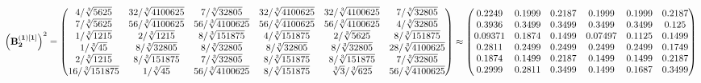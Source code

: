 \documentclass[10pt,a4paper]{article}
\begin{document}
	\[
		\left(\bold{B_2^{(1)[1]}}\right)^{2} = 
		\begin{pmatrix}
			{{4}} / {\sqrt[3]{5625}} & {{32}} / {\sqrt[3]{4100625}} & {{7}} / {\sqrt[3]{32805}} & {{32}} / {\sqrt[3]{4100625}} & {{32}} / {\sqrt[3]{4100625}} & {{7}} / {\sqrt[3]{32805}} \\
			{{7}} / {\sqrt[3]{5625}} & {{56}} / {\sqrt[3]{4100625}} & {{56}} / {\sqrt[3]{4100625}} & {{56}} / {\sqrt[3]{4100625}} & {{56}} / {\sqrt[3]{4100625}} & {{4}} / {\sqrt[3]{32805}} \\
			{1} / {\sqrt[3]{1215}} & {{2}} / {\sqrt[3]{1215}} & {{8}} / {\sqrt[3]{151875}} & {{4}} / {\sqrt[3]{151875}} & {{2}} / {\sqrt[3]{5625}} & {{8}} / {\sqrt[3]{151875}} \\
			{1} / {\sqrt[3]{45}} & {{8}} / {\sqrt[3]{32805}} & {{8}} / {\sqrt[3]{32805}} & {{8}} / {\sqrt[3]{32805}} & {{8}} / {\sqrt[3]{32805}} & {{28}} / {\sqrt[3]{4100625}} \\
			{{2}} / {\sqrt[3]{1215}} & {{8}} / {\sqrt[3]{151875}} & {{7}} / {\sqrt[3]{32805}} & {{8}} / {\sqrt[3]{151875}} & {{8}} / {\sqrt[3]{151875}} & {{7}} / {\sqrt[3]{32805}} \\
			{{16}} / {\sqrt[3]{151875}} & {1} / {\sqrt[3]{45}} & {{56}} / {\sqrt[3]{4100625}} & {{8}} / {\sqrt[3]{151875}} & {\sqrt[3]{3}} / {\sqrt[3]{625}} & {{56}} / {\sqrt[3]{4100625}} \\
		\end{pmatrix}
		\approx
		\begin{pmatrix}
			0.2249   & 0.1999   & 0.2187   & 0.1999   & 0.1999   & 0.2187   \\
			0.3936   & 0.3499   & 0.3499   & 0.3499   & 0.3499   & 0.125    \\
			0.09371  & 0.1874   & 0.1499   & 0.07497  & 0.1125   & 0.1499   \\
			0.2811   & 0.2499   & 0.2499   & 0.2499   & 0.2499   & 0.1749   \\
			0.1874   & 0.1499   & 0.2187   & 0.1499   & 0.1499   & 0.2187   \\
			0.2999   & 0.2811   & 0.3499   & 0.1499   & 0.1687   & 0.3499   \\
		\end{pmatrix}
	\]
\end{document}

